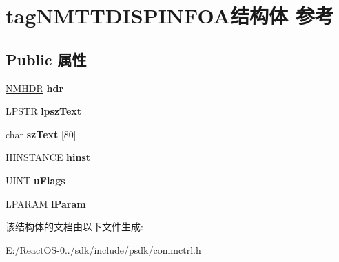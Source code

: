 \hypertarget{structtag_n_m_t_t_d_i_s_p_i_n_f_o_a}{}\section{tag\+N\+M\+T\+T\+D\+I\+S\+P\+I\+N\+F\+O\+A结构体 参考}
\label{structtag_n_m_t_t_d_i_s_p_i_n_f_o_a}
\subsection*{Public 属性}
\begin{DoxyCompactItemize}
\item 
\mbox{\label{structtag_n_m_t_t_d_i_s_p_i_n_f_o_a_a109e7975f7dc747d1fffb4b0d7dfb7fb}} 
\hyperlink{structtag_n_m_h_d_r}{N\+M\+H\+DR} {\bfseries hdr}
\item 
\mbox{\label{structtag_n_m_t_t_d_i_s_p_i_n_f_o_a_a51974584d9acb64113a7372667ea5ad9}} 
L\+P\+S\+TR {\bfseries lpsz\+Text}
\item 
\mbox{\label{structtag_n_m_t_t_d_i_s_p_i_n_f_o_a_a610d42bf33286c25097a4456cd5fc837}} 
char {\bfseries sz\+Text} \mbox{[}80\mbox{]}
\item 
\mbox{\label{structtag_n_m_t_t_d_i_s_p_i_n_f_o_a_a83caa24983c018737bd33267e31e2178}} 
\hyperlink{interfacevoid}{H\+I\+N\+S\+T\+A\+N\+CE} {\bfseries hinst}
\item 
\mbox{\label{structtag_n_m_t_t_d_i_s_p_i_n_f_o_a_aa1945efe7dd95e939b0980f4a2b9099c}} 
U\+I\+NT {\bfseries u\+Flags}
\item 
\mbox{\label{structtag_n_m_t_t_d_i_s_p_i_n_f_o_a_a30c67193a4bfd33d324ef8ec7c2c3af6}} 
L\+P\+A\+R\+AM {\bfseries l\+Param}
\end{DoxyCompactItemize}


该结构体的文档由以下文件生成\+:\begin{DoxyCompactItemize}
\item 
E\+:/\+React\+O\+S-\/0../sdk/include/psdk/commctrl.\+h\end{DoxyCompactItemize}
